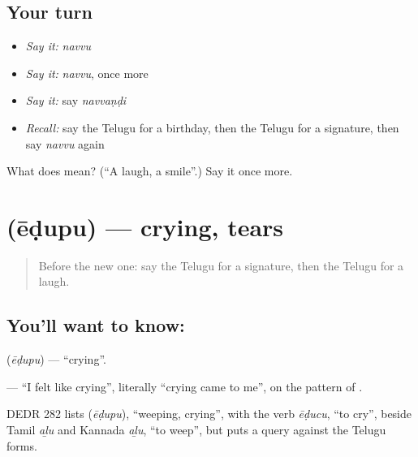\subsection*{Your turn}
\begin{itemize}
\raggedright
  \item \emph{Say it:} \emph{navvu}
  \item \emph{Say it:} \emph{navvu}, once more
  \item \emph{Say it:} say \emph{navvaṇḍi}
  \item \emph{Recall:} say the Telugu for a birthday, then the Telugu for a signature, then say \emph{navvu} again
\end{itemize}

\begin{tcolorbox}[breakable,colback=teal!4,colframe=teal!35!black,title={Before you move on}]
What does  mean? (\textquotedblleft{}A laugh, a smile\textquotedblright{}.) Say it once more.
\end{tcolorbox}
\section[\texorpdfstring{\te{ఏడుపు} (ēḍupu)}{ఏడుపు (ēḍupu)}]{ (ēḍupu) — crying, tears}

\label{lesson:TE-C97-crying}



\begin{quote}
Before the new one: say the Telugu for a signature, then the Telugu for a laugh.
\end{quote}

\subsection*{You'll want to know: }
\textbf{} (\emph{ēḍupu}) — \textquotedblleft{}crying\textquotedblright{}.

\textbf{  } — \textquotedblleft{}I felt like crying\textquotedblright{}, literally \textquotedblleft{}crying came to me\textquotedblright{}, on the pattern of \textbf{ }.

\begin{cousinweb}
DEDR 282 lists \textbf{} (\emph{ēḍupu}), \textquotedblleft{}weeping, crying\textquotedblright{}, with the verb \emph{ēḍucu}, \textquotedblleft{}to cry\textquotedblright{}, beside Tamil \emph{aḻu} and Kannada \emph{aḻu}, \textquotedblleft{}to weep\textquotedblright{}, but puts a query against the Telugu forms.
\end{cousinweb}

